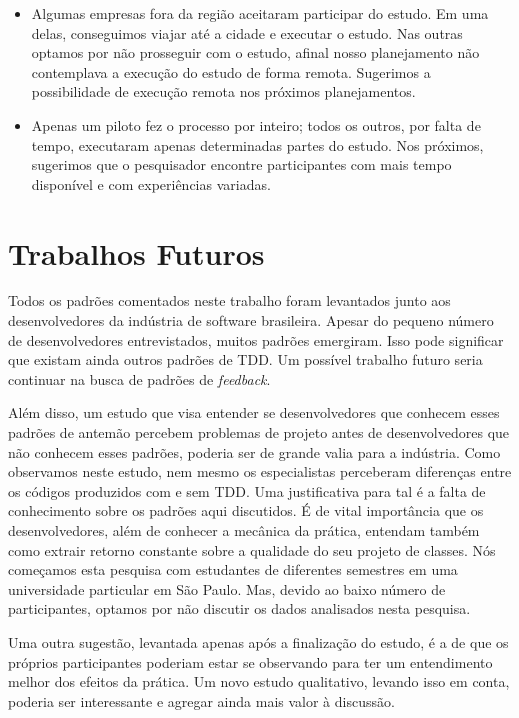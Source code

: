 \begin{itemize}
	\item Algumas empresas fora da região aceitaram participar do estudo. Em uma delas,
	conseguimos viajar até a cidade e executar o estudo. Nas outras optamos por não
	prosseguir com o estudo, afinal nosso planejamento não contemplava a execução
	do estudo de forma remota. Sugerimos a possibilidade de execução remota nos 
	próximos planejamentos.
	
	\item Apenas um piloto fez o processo por inteiro; todos os outros, por falta de tempo, 
	executaram apenas determinadas partes do estudo. Nos próximos, sugerimos
	que o pesquisador encontre participantes com mais tempo disponível e com experiências
	variadas.  
	
\end{itemize}

\section{Trabalhos Futuros}

Todos os padrões comentados neste trabalho foram levantados junto aos 
desenvolvedores da indústria de software brasileira. Apesar do pequeno
número de desenvolvedores entrevistados, muitos padrões emergiram. Isso
pode significar que existam ainda outros padrões de TDD. Um possível trabalho
futuro seria continuar na busca de padrões de \textit{feedback}.

Além disso, um estudo que visa entender se desenvolvedores que conhecem
esses padrões de antemão percebem problemas de projeto antes de desenvolvedores
que não conhecem esses padrões, poderia ser de grande valia para a indústria.
Como observamos neste estudo, nem mesmo os especialistas perceberam diferenças
entre os códigos produzidos com e sem TDD. Uma justificativa para tal é
a falta de conhecimento sobre os padrões aqui discutidos.
É de vital importância que os desenvolvedores, além
de conhecer a mecânica da prática, entendam também como extrair retorno constante
sobre a qualidade do seu projeto de classes. Nós começamos esta pesquisa com
estudantes de diferentes semestres em uma universidade particular em São Paulo. Mas,
devido ao baixo número de participantes, optamos por não discutir os dados
analisados nesta pesquisa.

Uma outra sugestão, levantada apenas após a finalização do estudo, é a de que
os próprios participantes poderiam estar se observando para ter um entendimento
melhor dos efeitos da prática. Um novo estudo qualitativo, levando isso em conta,
poderia ser interessante e agregar ainda mais valor à discussão.

